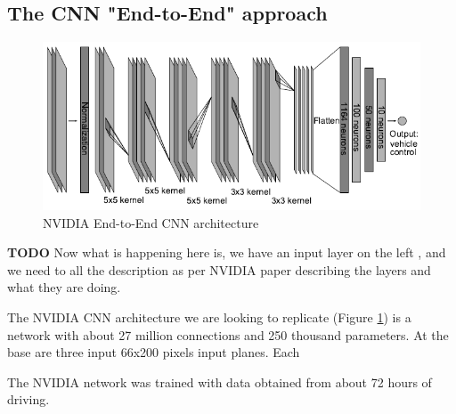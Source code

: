 \subsection{The CNN "End-to-End" approach}



\lipsum[2]

\begin{figure}[h]
 \centering 
 \includegraphics[width=\columnwidth]{figures/nvidia-end-to-end-horizontal.png}
 \caption{NVIDIA End-to-End CNN architecture}
 \label{fig:alv_system_configuration}
\end{figure}

\textbf{TODO} Now what is happening here is, we have an input layer on the left , and we need to all the description as per NVIDIA paper describing the layers and what they are doing.

The NVIDIA CNN architecture we are looking to replicate (Figure \ref{fig:alv_system_configuration}) is a network with about 27 million connections and 250 thousand parameters. At the base are three input 66x200 pixels input planes. Each 

The NVIDIA network was trained with data obtained from about 72 hours of driving. 

\lipsum[2]